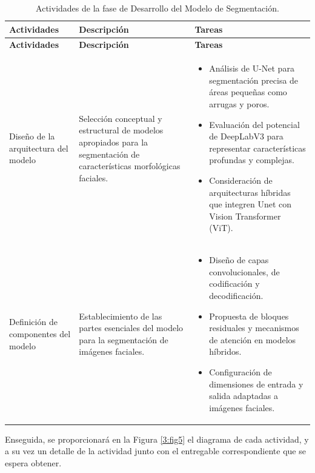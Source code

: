  \vspace{2ex}
 \begingroup
 \renewcommand\arraystretch{1.2}
 \begin{longtable}{>{\raggedright\arraybackslash}p{4cm} >{\raggedright\arraybackslash}p{4cm} >{\raggedright\arraybackslash}p{5cm}}
 \caption{Actividades de la fase de Desarrollo del Modelo de Segmentación.}
 \label{tabla:actividades_segmentacion}\\
 \toprule
 \textbf{Actividades} & \textbf{Descripción} & \textbf{Tareas} \\
 \midrule
 \endfirsthead
 
 \toprule
 \textbf{Actividades} & \textbf{Descripción} & \textbf{Tareas} \\
 \midrule
 \endhead
 
 \bottomrule
 \endfoot
 
 Diseño de la arquitectura del modelo & Selección conceptual y estructural de modelos apropiados para la segmentación de características morfológicas faciales. &
 \begin{itemize}
     \item Análisis de U-Net para segmentación precisa de áreas pequeñas como arrugas y poros.
     \item Evaluación del potencial de DeepLabV3 para representar características profundas y complejas.
     \item Consideración de arquitecturas híbridas que integren Unet con Vision Transformer (ViT).
 \end{itemize} \\
 
 Definición de componentes del modelo & Establecimiento de las partes esenciales del modelo para la segmentación de imágenes faciales. &
 \begin{itemize}
     \item Diseño de capas convolucionales, de codificación y decodificación.
     \item Propuesta de bloques residuales y mecanismos de atención en modelos híbridos.
     \item Configuración de dimensiones de entrada y salida adaptadas a imágenes faciales.
 \end{itemize} \\
 
 \end{longtable}
 \endgroup

 Enseguida, se proporcionará en la Figura \ref{3:fig5} el diagrama de cada actividad, y a su vez un detalle de la actividad junto con el entregable correspondiente que se espera obtener.
 
